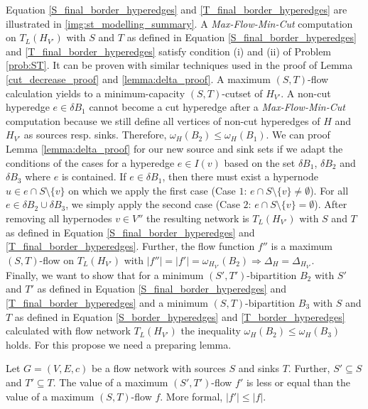 Equation \ref{S_final_border_hyperedges} and \ref{T_final_border_hyperedges} 
are illustrated in \autoref{img:st_modelling_summary}.
A \emph{Max-Flow-Min-Cut} computation on $T_L(H_{V'})$ with $S$ and $T$ as defined
in Equation \ref{S_final_border_hyperedges} and \ref{T_final_border_hyperedges} satisfy
condition (i) and (ii) of Problem \ref{prob:ST}. It can be proven with similar techniques
used in the proof of Lemma \ref{cut_decrease_proof} and \ref{lemma:delta_proof}. A maximum
$(S,T)$-flow calculation yields to a minimum-capacity $(S,T)$-cutset of $H_{V'}$. A non-cut hyperedge
$e \in \delta B_1$ cannot become a cut hyperedge after a \emph{Max-Flow-Min-Cut} computation
because we still define all vertices of non-cut hyperedges of $H$ and $H_{V'}$ as sources resp. sinks. 
Therefore, $\omega_H(B_2) \le \omega_H(B_1)$. We can proof Lemma \ref{lemma:delta_proof} for our
new source and sink sets if we adapt the conditions of the cases for a hyperedge $e \in I(v)$ 
based on the set $\delta B_1$, $\delta B_2$ and $\delta B_3$ where $e$ is contained. If
$e \in \delta B_1$, then there must exist a hypernode $u \in e \cap S \setminus \{v\}$ on
which we apply the first case (Case $1$: $e \cap S \setminus \{v\} \neq \emptyset$). 
For all $e \in \delta B_2 \cup \delta B_3$, we simply apply the second case
(Case $2$: $e \cap S \setminus \{v\} = \emptyset$). After removing all hypernodes $v \in V''$
the resulting network is $T_L(H_{V'})$ with $S$ and $T$ as defined in Equation
\ref{S_final_border_hyperedges} and \ref{T_final_border_hyperedges}. Further, the flow function
$f''$ is a maximum $(S,T)$-flow on $T_L(H_{V'})$ with $|f''| = |f'| = \omega_{H_{V'}}(B_2)
\Rightarrow \Delta_H = \Delta_{H_{V'}}$. \\
Finally, we want to show that for a minimum $(S',T')$-bipartition $B_2$ with $S'$ and $T'$ as defined
in Equation \ref{S_final_border_hyperedges} and \ref{T_final_border_hyperedges} and a minimum
$(S,T)$-bipartition $B_3$ with $S$ and $T$ as defined in Equation \ref{S_border_hyperedges}
and \ref{T_border_hyperedges} calculated with flow network $T_L(H_{V'})$ the inequality 
$\omega_H(B_2) \le \omega_H(B_3)$ holds. For this propose we need a preparing lemma.

\begin{lemma}
\label{lemma:ST_subset}
Let $G = (V,E,c)$ be a flow network with sources $S$ and sinks $T$. Further, $S' \subseteq S$
and $T' \subseteq T$. The value of a maximum $(S',T')$-flow $f'$ is less or equal than the value
of a maximum $(S,T)$-flow $f$. More formal, $|f'| \le |f|$.
\end{lemma}

